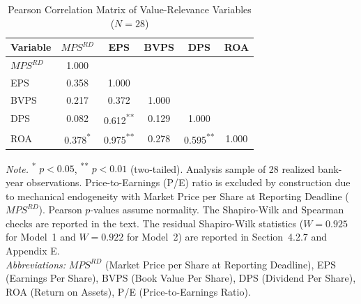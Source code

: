 \begin{table}[!htbp]
\centering
\small
\caption{Pearson Correlation Matrix of Value-Relevance Variables ($N = 28$)}
\label{tab:t2_correlations}
\begin{tabular}{lccccc}
\toprule
\textbf{Variable} & \textbf{$\mathit{MPS}^{RD}$} & \textbf{EPS} & \textbf{BVPS} & \textbf{DPS} & \textbf{ROA} \\
\midrule
$\mathit{MPS}^{RD}$ & 1.000 &  &  &  &  \\
\addlinespace
EPS & 0.358 & 1.000 &  &  &  \\
\addlinespace
BVPS & 0.217 & 0.372 & 1.000 &  &  \\
\addlinespace
DPS & 0.082 & 0.612\textsuperscript{**} & 0.129 & 1.000 &  \\
\addlinespace
ROA & 0.378\textsuperscript{*} & 0.975\textsuperscript{**} & 0.278 & 0.595\textsuperscript{**} & 1.000 \\
\bottomrule
\end{tabular}

\vspace{4pt}
\begin{minipage}{\linewidth}
\footnotesize
\textit{Note.} \textsuperscript{*} $p < 0.05$, \textsuperscript{**} $p < 0.01$ (two-tailed). Analysis sample of 28 realized bank-year observations. Price-to-Earnings (P/E) ratio is excluded by construction due to mechanical endogeneity with Market Price per Share at Reporting Deadline ($\mathit{MPS}^{RD}$). Pearson $p$-values assume normality. The Shapiro-Wilk and Spearman checks are reported in the text. The residual Shapiro-Wilk statistics ($W = 0.925$ for Model~1 and $W = 0.922$ for Model~2) are reported in Section~4.2.7 and Appendix E. \\
\textit{Abbreviations:} $\mathit{MPS}^{RD}$ (Market Price per Share at Reporting Deadline), EPS (Earnings Per Share), BVPS (Book Value Per Share), DPS (Dividend Per Share), ROA (Return on Assets), P/E (Price-to-Earnings Ratio).
\end{minipage}
\end{table}


